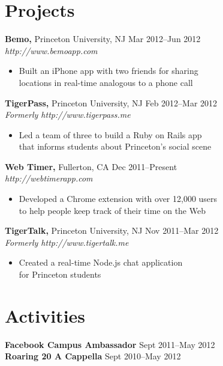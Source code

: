 \documentclass[margin]{res}
\begin{document}
\begin{resume}
\section{Projects}
 {\bf Bemo,} Princeton University, NJ \hfill Mar 2012--Jun 2012 \\
 {\it http://www.bemoapp.com}
 \begin{itemize} \itemsep -2pt  %
 \item Built an iPhone app with two friends for sharing \\
   locations in real-time analogous to a phone call
 \end{itemize}

 {\bf TigerPass,} Princeton University, NJ \hfill Feb 2012--Mar 2012 \\
 {\it Formerly http://www.tigerpass.me}
 \begin{itemize} \itemsep -2pt  %
 \item Led a team of three to build a Ruby on Rails app \\
   that informs students about Princeton's social scene
 \end{itemize}

 {\bf Web Timer,} Fullerton, CA \hfill Dec 2011--Present \\
 {\it http://webtimerapp.com}
 \begin{itemize} \itemsep -2pt  %
 \item Developed a Chrome extension with over 12,000 users \\
   to help people keep track of their time on the Web
 \end{itemize}

 {\bf TigerTalk,} Princeton University, NJ \hfill Nov 2011--Mar 2012 \\
 {\it Formerly http://www.tigertalk.me}
 \begin{itemize} \itemsep -2pt  %
 \item Created a real-time Node.js chat application \\
   for Princeton students
 \end{itemize}

\section{Activities}
 {\bf Facebook Campus Ambassador} \hfill Sept 2011--May 2012 \\
 {\bf Roaring 20 A Cappella} \hfill Sept 2010--May 2012 \\

\end{resume}
\end{document}
